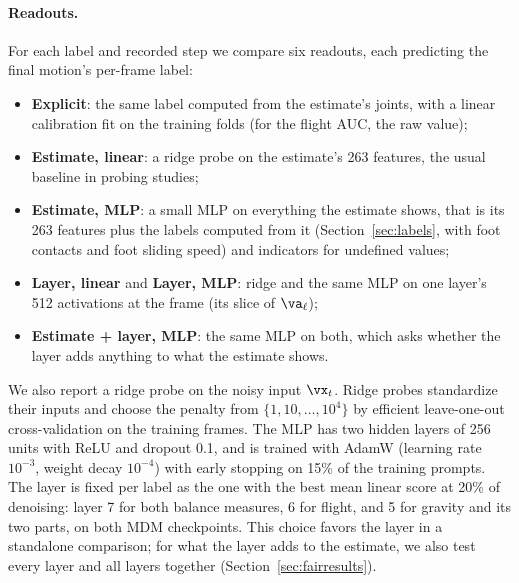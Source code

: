 \paragraph{Readouts.} For each label and recorded step we compare six readouts, each predicting the final motion's per-frame label:
\begin{itemize}
    \item \textbf{Explicit}: the same label computed from the estimate's joints, with a linear calibration fit on the training folds (for the flight AUC, the raw value);
    \item \textbf{Estimate, linear}: a ridge probe on the estimate's 263 features, the usual baseline in probing studies;
    \item \textbf{Estimate, MLP}: a small MLP on everything the estimate shows, that is its 263 features plus the labels computed from it (Section~\ref{sec:labels}, with foot contacts and foot sliding speed) and indicators for undefined values;
    \item \textbf{Layer, linear} and \textbf{Layer, MLP}: ridge and the same MLP on one layer's 512 activations at the frame (its slice of $\va_\ell$);
    \item \textbf{Estimate + layer, MLP}: the same MLP on both, which asks whether the layer adds anything to what the estimate shows.
\end{itemize}
We also report a ridge probe on the noisy input $\vx_t$. Ridge probes standardize their inputs and choose the penalty from $\{1, 10, \dots, 10^4\}$ by efficient leave-one-out cross-validation on the training frames. The MLP has two hidden layers of 256 units with ReLU and dropout 0.1, and is trained with AdamW (learning rate $10^{-3}$, weight decay $10^{-4}$) with early stopping on 15\% of the training prompts. The layer is fixed per label as the one with the best mean linear score at 20\% of denoising: layer 7 for both balance measures, 6 for flight, and 5 for gravity and its two parts, on both MDM checkpoints. This choice favors the layer in a standalone comparison; for what the layer adds to the estimate, we also test every layer and all layers together (Section~\ref{sec:fairresults}).

